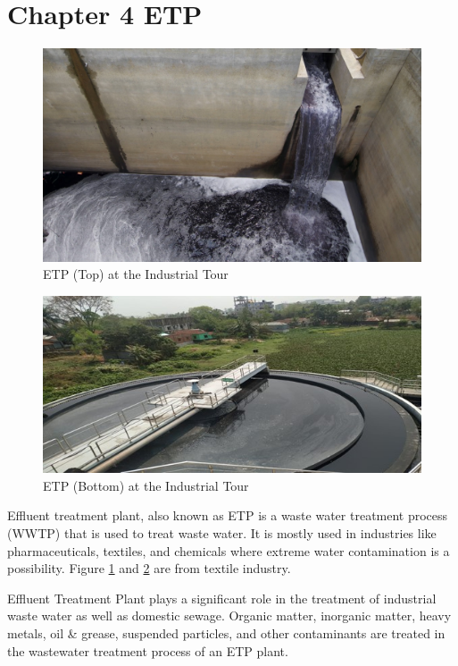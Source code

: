 \section{Chapter 4 ETP}
\begin{figure}[h!]
    \centering
    \includegraphics[width=1\linewidth]{figs/etp.jpg}
    \caption{ETP (Top) at the Industrial Tour}
    \label{fig:etp}
\end{figure}

\begin{figure}[h!]
    \centering
    \includegraphics[width=1\linewidth]{figs/etp2.jpg}
    \caption{ETP (Bottom) at the Industrial Tour}
    \label{fig:etp2}
\end{figure}

Effluent treatment plant, also known as ETP is a waste water treatment process (WWTP) that is used to treat waste water. It is mostly used in industries like pharmaceuticals, textiles, and chemicals where extreme water contamination is a possibility. Figure \ref{fig:etp} and \ref{fig:etp2} are from textile industry.

Effluent Treatment Plant plays a significant role in the treatment of industrial waste water as well as domestic sewage. Organic matter, inorganic matter, heavy metals, oil \& grease, suspended particles, and other contaminants are treated in the wastewater treatment process of an ETP plant. 

